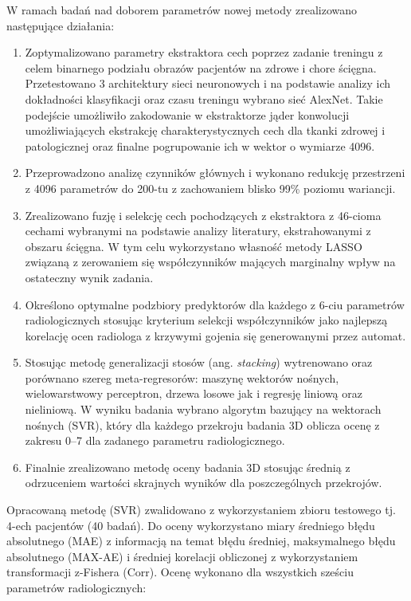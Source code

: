W ramach badań nad doborem parametrów nowej metody zrealizowano następujące działania:
\begin{enumerate}
	\item Zoptymalizowano parametry ekstraktora cech poprzez zadanie treningu z celem binarnego podziału obrazów pacjentów na zdrowe i chore ścięgna. Przetestowano 3 architektury sieci neuronowych i na podstawie analizy ich dokładności klasyfikacji oraz czasu treningu wybrano sieć AlexNet. Takie podejście umożliwiło zakodowanie w ekstraktorze jąder konwolucji umożliwiających ekstrakcję charakterystycznych cech dla tkanki zdrowej i patologicznej oraz finalne pogrupowanie ich w wektor o wymiarze 4096.
	\item Przeprowadzono analizę czynników głównych i wykonano redukcję przestrzeni z 4096 parametrów do 200-tu z zachowaniem blisko 99\% poziomu wariancji.
	\item Zrealizowano fuzję i selekcję cech pochodzących z ekstraktora z 46-cioma cechami wybranymi na podstawie analizy literatury, ekstrahowanymi z obszaru ścięgna. W tym celu wykorzystano własność metody LASSO związaną z zerowaniem się współczynników mających marginalny wpływ na ostateczny wynik zadania.
	\item Określono optymalne podzbiory predyktorów dla każdego z 6-ciu parametrów radiologicznych stosując kryterium selekcji współczynników jako najlepszą korelację ocen radiologa z krzywymi gojenia się generowanymi przez automat.
	\item Stosując metodę generalizacji stosów (ang. \textit{stacking}) wytrenowano oraz porównano szereg meta-regresorów: maszynę wektorów nośnych, wielowarstwowy perceptron, drzewa losowe jak i regresję liniową oraz nieliniową. W wyniku badania wybrano algorytm bazujący na wektorach nośnych (SVR), który dla każdego przekroju badania 3D oblicza ocenę z zakresu 0--7 dla zadanego parametru radiologicznego.
	\item Finalnie zrealizowano metodę oceny badania 3D stosując średnią z odrzuceniem wartości skrajnych wyników dla poszczególnych przekrojów.
\end{enumerate}

Opracowaną metodę (SVR) zwalidowano z wykorzystaniem zbioru testowego tj. 4-ech pacjentów (40 badań). Do oceny wykorzystano miary średniego błędu absolutnego (MAE) z informacją na temat błędu średniej, maksymalnego błędu absolutnego (MAX-AE) i średniej korelacji obliczonej z wykorzystaniem transformacji z-Fishera (Corr). Ocenę wykonano dla wszystkich sześciu parametrów radiologicznych:

